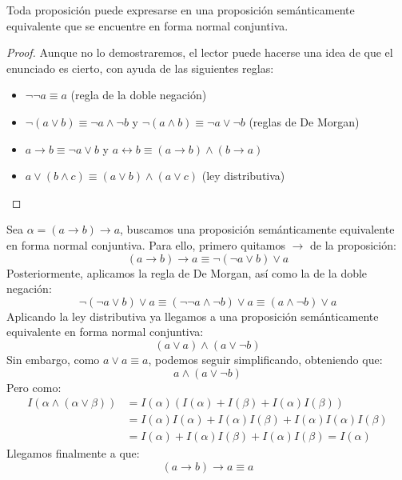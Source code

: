  \begin{prop}
     Toda proposición puede expresarse en una proposición semánticamente equivalente que se encuentre en forma normal conjuntiva.
     \begin{proof}
         Aunque no lo demostraremos, el lector puede hacerse una idea de que el enunciado es cierto, con ayuda de las siguientes reglas:
         \begin{itemize}
             \item $\lnot\lnot a\equiv a$ (regla de la doble negación)
             \item $\lnot(a\lor b) \equiv \lnot a\land\lnot b$ y $\lnot(a\land b) \equiv \lnot a\lor \lnot b$ (reglas de De Morgan)
             \item $a\to b \equiv \lnot a\lor b$ y $a \leftrightarrow b \equiv (a\to b) \land (b\to a)$
             \item $a\lor (b\land c) \equiv (a\lor b) \land (a\lor c)$ (ley distributiva)
         \end{itemize}
     \end{proof}
 \end{prop}

 \begin{ejemplo}
     Sea $\alpha = (a\to b)\to a$, buscamos una proposición semánticamente equivalente en forma normal conjuntiva. Para ello, primero quitamos $\to$ de la proposición:
     \begin{equation*}
         (a\to b)\to a \equiv \lnot(\lnot a\lor b) \lor a
     \end{equation*}
     Posteriormente, aplicamos la regla de De Morgan, así como la de la doble negación:
     \begin{equation*}
         \lnot(\lnot a\lor b) \lor a \equiv (\lnot\lnot a\land \lnot b) \lor a \equiv (a\land \lnot b)\lor a
     \end{equation*}
     Aplicando la ley distributiva ya llegamos a una proposición semánticamente equivalente en forma normal conjuntiva:
     \begin{equation*}
         (a \lor a) \land (a \lor \lnot b)
     \end{equation*}
     Sin embargo, como $a \lor a \equiv a$, podemos seguir simplificando, obteniendo que:
     \begin{equation*}
         a \land (a \lor \lnot b)
     \end{equation*}
     Pero como:
     \begin{align*}
         I(\alpha \land (\alpha\lor \beta)) &= I(\alpha)(I(\alpha)+I(\beta)+I(\alpha)I(\beta)) \\
                                            &= I(\alpha)I(\alpha) + I(\alpha)I(\beta) + I(\alpha)I(\alpha)I(\beta) \\
                                            &= I(\alpha) + I(\alpha) I(\beta) + I(\alpha)I(\beta) = I(\alpha)
     \end{align*}
     Llegamos finalmente a que:
     \begin{equation*}
         (a\to b)\to a \equiv a
     \end{equation*}
 \end{ejemplo}

